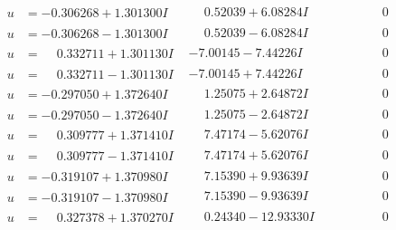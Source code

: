 \documentclass[1p]{elsarticle_modified}
\theoremstyle{definition}
\begin{document}
$$\begin{array}{c|c|c}
\begin{aligned}
u &= -0.306268 + 1.301300 I\end{aligned}
 & \phantom{-}0.52039 + 6.08284 I & \phantom{-0.000000 } 0 \\ \hline\begin{aligned}
u &= -0.306268 - 1.301300 I\end{aligned}
 & \phantom{-}0.52039 - 6.08284 I & \phantom{-0.000000 } 0 \\ \hline\begin{aligned}
u &= \phantom{-}0.332711 + 1.301130 I\end{aligned}
 & -7.00145 - 7.44226 I & \phantom{-0.000000 } 0 \\ \hline\begin{aligned}
u &= \phantom{-}0.332711 - 1.301130 I\end{aligned}
 & -7.00145 + 7.44226 I & \phantom{-0.000000 } 0 \\ \hline\begin{aligned}
u &= -0.297050 + 1.372640 I\end{aligned}
 & \phantom{-}1.25075 + 2.64872 I & \phantom{-0.000000 } 0 \\ \hline\begin{aligned}
u &= -0.297050 - 1.372640 I\end{aligned}
 & \phantom{-}1.25075 - 2.64872 I & \phantom{-0.000000 } 0 \\ \hline\begin{aligned}
u &= \phantom{-}0.309777 + 1.371410 I\end{aligned}
 & \phantom{-}7.47174 - 5.62076 I & \phantom{-0.000000 } 0 \\ \hline\begin{aligned}
u &= \phantom{-}0.309777 - 1.371410 I\end{aligned}
 & \phantom{-}7.47174 + 5.62076 I & \phantom{-0.000000 } 0 \\ \hline\begin{aligned}
u &= -0.319107 + 1.370980 I\end{aligned}
 & \phantom{-}7.15390 + 9.93639 I & \phantom{-0.000000 } 0 \\ \hline\begin{aligned}
u &= -0.319107 - 1.370980 I\end{aligned}
 & \phantom{-}7.15390 - 9.93639 I & \phantom{-0.000000 } 0 \\ \hline\begin{aligned}
u &= \phantom{-}0.327378 + 1.370270 I\end{aligned}
 & \phantom{-}0.24340 - 12.93330 I & \phantom{-0.000000 } 0 \\ \hline\begin{aligned}

\end{aligned}
\end{array}$$
\end{document}
